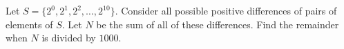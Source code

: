 Let $ S = \{2^0,2^1,2^2,\ldots,2^{10}\}$. Consider all possible positive differences of pairs of elements of $ S$. Let $ N$ be the sum of all of these differences. Find the remainder when $ N$ is divided by $ 1000$.